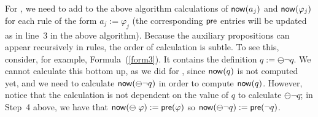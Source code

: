  For \EPLTL{},  we need to  add to the above
algorithm calculations 
of $\mathsf{now} ( a_j )$ and
$\mathsf{now} ( \varphi_j )$ for each rule of
the form $a_j := \varphi_j$ (the corresponding
$\mathsf{pre}$ entries will be updated as in line~3 in the above algorithm).
%
%
Because the
auxiliary propositions can appear recursively in \EPLTL{} rules, the order of calculation is
subtle. To see this, consider, for example, Formula~(\ref{form3}). It contains
the definition $q := \ominus \neg q$. We cannot calculate this
bottom up, as we did for \PLTL{}, since $\mathsf{now} ( q )$ is not computed yet, and we need 
to calculate $\mathsf{now} ( \ominus \neg q )$ in order 
to compute $\mathsf{now} ( q )$.
However, notice that the calculation is not dependent on the
value of $q$ to calculate $\ominus \neg q$; 
in Step~4 above, we have that
$\mathsf{now} ( \ominus \; \varphi ) := \mathsf{pre} ( \varphi )$
so  $\mathsf{now} ( \ominus \neg q ) := \mathsf{pre} ( \neg q )$.
%

